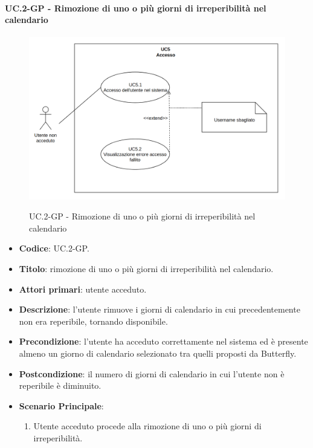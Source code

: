 		\paragraph{UC\theuccount.2-GP - Rimozione di uno o più giorni di irreperibilità nel calendario}
		\begin{figure}[H]
			\centering
			\includegraphics[width=\columnwidth]{img/UC5.png}\\
			\caption{UC\theuccount.2-GP - Rimozione di uno o più giorni di irreperibilità nel calendario}
		\end{figure}
		\begin{itemize}
			\item \textbf{Codice}: UC\theuccount.2-GP.
			\item \textbf{Titolo}: rimozione di uno o più giorni di irreperibilità nel calendario.
			\item \textbf{Attori primari}: utente acceduto.
			\item \textbf{Descrizione}: l’utente rimuove i giorni di calendario in cui precedentemente
			non era reperibile, tornando disponibile.
			\item \textbf{Precondizione}: l’utente ha acceduto correttamente nel sistema ed è presente
			almeno un giorno di calendario selezionato tra quelli proposti da Butterfly.
			\item \textbf{Postcondizione}: il numero di giorni di calendario in cui l’utente non è reperibile è diminuito.
			\item \textbf{Scenario Principale}:
			\begin{enumerate}
				\item Utente acceduto procede alla rimozione di uno o più giorni di irreperibilità.
			\end{enumerate}
		\end{itemize}
		
